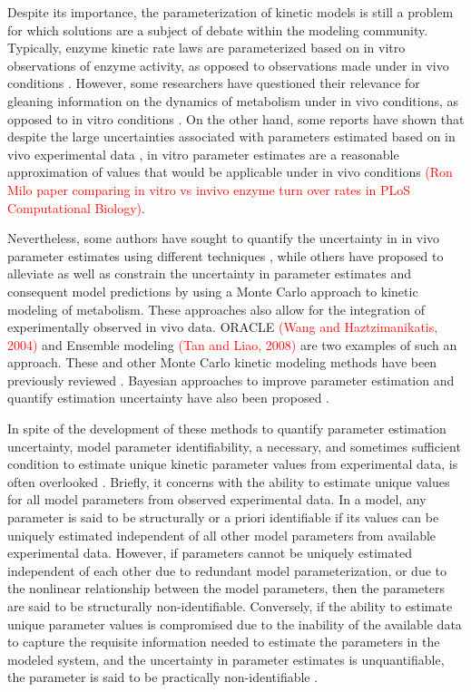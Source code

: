 \documentclass[10pt]{article}
\begin{document}
	Despite its importance, the parameterization of kinetic models is still a problem for which solutions are a subject of debate within the modeling community. Typically, enzyme kinetic rate laws are parameterized based on in vitro observations of enzyme activity, as opposed to observations made under in vivo conditions \parencite{Heijnen2005,Smallbone2007}. However, some researchers have questioned their relevance for gleaning information on the dynamics of metabolism under in vivo conditions, as opposed to in vitro conditions \parencite{Heijnen2005,Heijnen2013}. On the other hand, some reports have shown that despite the large uncertainties associated with parameters estimated based on in vivo experimental data \parencite{Link2014}, in vitro parameter estimates are a reasonable approximation of values that would be applicable under in vivo conditions \textcolor{red}{(Ron Milo paper comparing in vitro vs invivo enzyme turn over rates in PLoS Computational Biology)}.
	
	 Nevertheless, some authors have sought to quantify the uncertainty in in vivo parameter estimates using different techniques \parencite{Vanlier2013,Andreozzi2016a}, while others have proposed to alleviate as well as constrain the uncertainty in parameter estimates and consequent model predictions by using a Monte Carlo approach to kinetic modeling of metabolism. These approaches also allow for the integration of experimentally observed in vivo data. ORACLE \textcolor{red}{(Wang and Haztzimanikatis, 2004)} and Ensemble modeling \textcolor{red}{(Tan and Liao, 2008)} are two examples of such an approach. These and other Monte Carlo kinetic modeling methods have been previously reviewed \parencite{Srinivasan2015}. Bayesian approaches to improve parameter estimation and quantify estimation uncertainty have also been proposed \parencite{Saa2016}.
	
	In spite of the development of these methods to quantify parameter estimation uncertainty, model parameter identifiability, a necessary, and sometimes sufficient condition to estimate unique kinetic parameter values from experimental data, is often overlooked \parencite{Ljung1994,Berthoumieux2013}. Briefly, it concerns with the ability to estimate unique values for all model parameters from observed experimental data. In a model, any parameter is said to be structurally or a priori identifiable if its values can be uniquely estimated independent of all other model parameters from available experimental data. However, if parameters cannot be uniquely estimated independent of each other due to redundant model parameterization, or due to the nonlinear relationship between the model parameters, then the parameters are said to be structurally non-identifiable. Conversely, if the ability to estimate unique parameter values is compromised due to the inability of the available data to capture the requisite information needed to estimate the parameters in the modeled system, and the uncertainty in parameter estimates is unquantifiable, the parameter is said to be practically non-identifiable \parencite{Ljung1994}. 
	
\end{document}
